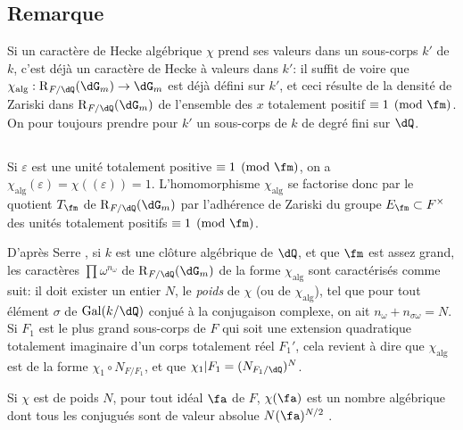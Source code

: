 \subsection{Remarque}\label{VI:5-4}

Si un caract\`ere de Hecke alg\'ebrique $\chi$ prend ses valeurs dans un 
sous-corps $k'$ de $k$, c'est d\'ej\`a un caract\`ere de Hecke \`a valeurs dans 
$k'$: il suffit de voire que $\chi_\text{alg}:\res_{F/\dQ}(\dG_m) \to \dG_m$ 
est d\'ej\`a d\'efini sur $k'$, et ceci r\'esulte de la densit\'e de Zariski 
dans $\res_{F/\dQ}(\dG_m)$ de l'ensemble des $x$ totalement positif 
$\equiv 1\pmod\fm$. On pour toujours prendre pour $k'$ un sous-corps de $k$ de 
degr\'e fini sur $\dQ$. 





\subsection{}\label{VI:5-5}

Si $\varepsilon$ est une unit\'e totalement positive $\equiv 1\pmod\fm$, on a 
$\chi_\text{alg}(\varepsilon) = \chi((\varepsilon)) = 1$. L'homomorphisme 
$\chi_\text{alg}$ se factorise donc par le quotient $T_\fm$ de 
$\res_{F/\dQ}(\dG_m)$ par l'adh\'erence de Zariski du groupe 
$E_\fm\subset F^\times$ des unit\'es totalement positifs $\equiv 1\pmod\fm$. 

D'apr\`es Serre \cite[II.3]{se68}, si $k$ est une cl\^oture alg\'ebrique de 
$\dQ$, et que $\fm$ est assez grand, les caract\`eres $\prod \omega^{n_\omega}$ 
de $\res_{F/\dQ}(\dG_m)$ de la forme $\chi_\text{alg}$ sont caract\'eris\'es 
comme suit: il doit exister un entier $N$, le \emph{poids} de $\chi$ (ou de 
$\chi_\text{alg}$), tel que pour tout \'el\'ement $\sigma$ de $\gal(k/\dQ)$ 
conju\'e \`a la conjugaison complexe, on ait $n_\omega+n_{\sigma \omega}=N$. Si 
$F_1$ est le plus grand sous-corps de $F$ qui soit une extension quadratique 
totalement imaginaire d'un corps totalement r\'eel $F_1'$, cela revient \`a 
dire que $\chi_\text{alg}$ est de la forme $\chi_1\circ N_{F/F_1}$, et que 
$\chi_1|F_1=(N_{F_1/\dQ})^N$. 

Si $\chi$ est de poids $N$, pour tout id\'eal $\fa$ de $F$, $\chi(\fa)$ est un 
nombre alg\'ebrique dont tous les conjugu\'es sont de valeur absolue 
$N(\fa)^{N/2}$ \cite[II.3 prop.2]{se68}. 





\subsection{}\label{VI:5-6}

